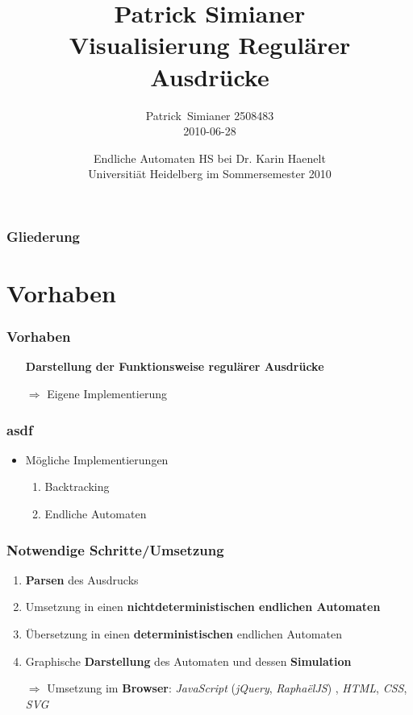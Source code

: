 \documentclass[ignorenonframetext]{beamer}
\title[regexvis]{Patrick Simianer\\ Visualisierung Regulärer Ausdrücke}
\author{Patrick~Simianer \tiny 2508483\\\normalsize 2010-06-28}
\date{Endliche Automaten HS bei Dr. Karin Haenelt\\ Universitiät Heidelberg im Sommersemester 2010}
\begin{document}
\frame[plain]{\titlepage}



\begin{frame}[plain]
    \frametitle{Gliederung}
    \tableofcontents
\end{frame}



\section{Vorhaben}


\begin{frame}
    \frametitle{Vorhaben}
	
	\begin{itemize}
		\item[] \textbf{Darstellung der Funktionsweise regulärer Ausdrücke}
		\item[]
		\item[$\Rightarrow$] Eigene Implementierung
	\end{itemize}
\end{frame}

\begin{frame}
    \frametitle{asdf}

	\begin{itemize}
		\item Mögliche Implementierungen
		\begin{enumerate}
			\item Backtracking
			\item Endliche Automaten
		\end{enumerate}
	\end{itemize}
\end{frame}

\begin{frame}
    \frametitle{Notwendige Schritte/Umsetzung}
	
	\begin{enumerate}
		\item \textbf{Parsen} des Ausdrucks
		\item Umsetzung in einen \textbf{nichtdeterministischen endlichen Automaten}
		\item Übersetzung in einen \textbf{deterministischen} endlichen Automaten
		\item Graphische \textbf{Darstellung} des Automaten und dessen \textbf{Simulation}
		\item[]
		\item[$\Rightarrow$] Umsetzung im \textbf{Browser}: \textit{JavaScript} (\textit{jQuery}, \textit{Rapha\"elJS}) , \textit{HTML}, \textit{CSS}, \textit{SVG}
	\end{enumerate}
\end{frame}
\end{document}
